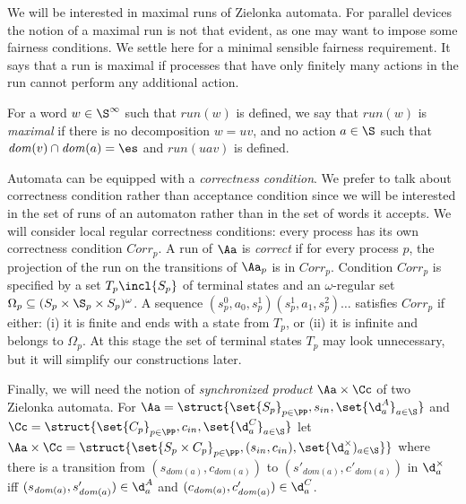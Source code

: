 \documentclass[10pt,a4paper]{article}
\newcommand{\run}{\mathit{run}}
\newcommand{\Cor}{\mathit{Corr}}
\newcommand{\loc}{\mathit{dom}}
\begin{document}
We will be interested in maximal runs of Zielonka
automata. For parallel devices the notion of a maximal run is not that
evident, as one may want to impose some fairness conditions. We settle here
for a minimal sensible fairness requirement. It says that a run is
maximal if processes that have only finitely many actions in the run
cannot perform any additional action.

\begin{definition}
For a word $w \in\S^\infty$ such that $\run(w)$ is
defined, we say that $\run(w)$ is
\emph{maximal} if there is no 
decomposition $w=uv$, and no action
$a \in \S$ such that $\loc(v) \cap \loc(a)=\es$ and $\run(uav)$ is defined. 
\end{definition}




Automata can be equipped with a \emph{correctness condition}. We prefer
to talk about correctness condition rather than acceptance condition
since we will be interested in the set of runs of an automaton rather
than in the set of words it accepts. We will consider local
regular correctness conditions: every process has its own correctness
condition $\Cor_p$. A run of $\Aa$ is
\emph{correct} if for every process $p$, the projection of the run on
the transitions of $\Aa_p$ is in $\Cor_p$. Condition
$\Cor_p$ is 
specified by a set $T_p \incl {S_p}$ of terminal states and an
$\omega$-regular set $\Omega_p \subseteq (S_p \times \S_p \times
S_p)^\omega$. A sequence $(s^0_p,a_0,s^1_p) (s^1_p,a_1,s^2_p) \dots$ satisfies
$\Cor_p$ if either: (i) 
it is finite and ends with a state from $T_p$, or (ii)
it is infinite and belongs to $\Omega_p$.
At this stage the set of terminal states $T_p$ may look unnecessary, but
it will simplify our constructions later. 

Finally, we will need the notion of \emph{synchronized product}
$\Aa\times\Cc$ of two Zielonka automata. For
$\Aa=\struct{\set{S_p}_{p\in \PP},s_{in},\set{\d^A_a}_{a\in\S}}$ and
$\Cc=\struct{\set{C_p}_{p\in \PP},c_{in},\set{\d^C_a}_{a\in\S}}$ let
$\Aa \times \Cc=\struct{\set{S_p\times C_p}_{p\in
    \PP},(s_{in},c_{in}),\set{\d^\times_a)_{a\in\S}}}$ where there is
a transition from $(s_{\loc(a)},c_{\loc(a)})$ to
$(s'_{\loc(a)},c'_{\loc(a)})$ in $\d^\times_a$ iff $(s_{\loc(a)},
s'_{\loc(a)}) \in \d^A_a$ and $(c_{\loc(a)}, c'_{\loc(a)}) \in \d^C_a$.

\medskip
\end{document}
